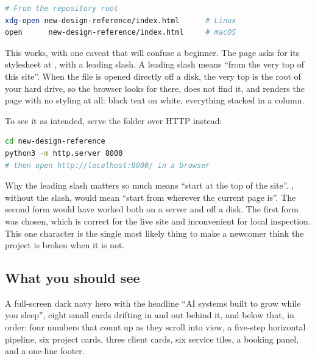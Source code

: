 \documentclass[11pt,a4paper]{article}
\begin{document}
\begin{lstlisting}[language=bash,caption={The simplest way: open the file directly}]
# From the repository root
xdg-open new-design-reference/index.html      # Linux
open      new-design-reference/index.html     # macOS
\end{lstlisting}

This works, with one caveat that will confuse a beginner. The page asks for its
stylesheet at , with a leading slash. A leading slash means
``from the very top of this site''. When the file is opened directly off a disk,
the very top is the root of your hard drive, so the browser looks for
 there, does not find it, and renders the page with no
styling at all: black text on white, everything stacked in a column.

To see it as intended, serve the folder over HTTP instead:

\begin{lstlisting}[language=bash,caption={The way that actually looks right}]
cd new-design-reference
python3 -m http.server 8000
# then open http://localhost:8000/ in a browser
\end{lstlisting}

\begin{keyidea}{Why the leading slash matters so much}
 means ``start at the top of the site''.
, without the slash, would mean ``start from wherever the
current page is''. The second form would have worked both on a server and off a
disk. The first form was chosen, which is correct for the live site and
inconvenient for local inspection. This one character is the single most likely
thing to make a newcomer think the project is broken when it is not.
\end{keyidea}

\subsection{What you should see}

A full-screen dark navy hero with the headline ``AI systems built to grow while
you sleep'', eight small cards drifting in and out behind it, and below that, in
order: four numbers that count up as they scroll into view, a five-step
horizontal pipeline, six project cards, three client cards, six service tiles, a
booking panel, and a one-line footer.

\end{document}
